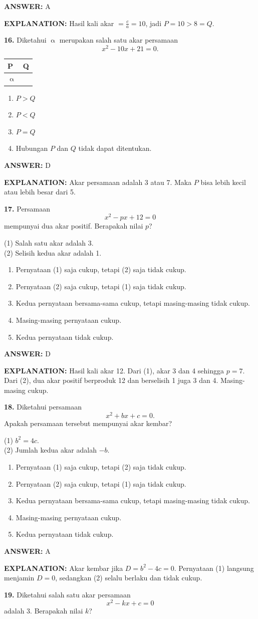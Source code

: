 \documentclass[11pt,a4paper]{article}
\newcommand{\answer}[1]{\par\medskip\textbf{\color{jawab}ANSWER:} #1\par}
\newcommand{\explanation}[1]{\textbf{\color{jelas}EXPLANATION:} #1\par\medskip}
\newcommand{\question}[1]{\Needspace{7\baselineskip}\par\medskip\textbf{#1}\quad}
\newenvironment{choices}{\begin{enumerate}[label=\Alph*.,leftmargin=1.8em]}{\end{enumerate}}
\begin{document}
\answer{A}\explanation{Hasil kali akar $=\frac ca=10$, jadi $P=10>8=Q$.}
\question{16.} Diketahui $\upalpha$ merupakan salah satu akar persamaan \[x^2-10x+21=0.\]
\begin{center}\begin{tabular}{|>{\centering\arraybackslash}p{}|>{\centering\arraybackslash}p{}|}\hline\textbf{P}&\textbf{Q}\\\hline$\upalpha$&5\\\hline\end{tabular}\end{center}
\begin{choices}\item $P>Q$\item $P<Q$\item $P=Q$\item Hubungan $P$ dan $Q$ tidak dapat ditentukan.\end{choices}
\answer{D}\explanation{Akar persamaan adalah 3 atau 7. Maka $P$ bisa lebih kecil atau lebih besar dari 5.}
\question{17.} Persamaan \[x^2-px+12=0\] mempunyai dua akar positif. Berapakah nilai $p$?

(1) Salah satu akar adalah 3.\\
(2) Selisih kedua akar adalah 1.
\begin{choices}\item Pernyataan (1) saja cukup, tetapi (2) saja tidak cukup.\item Pernyataan (2) saja cukup, tetapi (1) saja tidak cukup.\item Kedua pernyataan bersama-sama cukup, tetapi masing-masing tidak cukup.\item Masing-masing pernyataan cukup.\item Kedua pernyataan tidak cukup.\end{choices}
\answer{D}\explanation{Hasil kali akar 12. Dari (1), akar 3 dan 4 sehingga $p=7$. Dari (2), dua akar positif berproduk 12 dan berselisih 1 juga 3 dan 4. Masing-masing cukup.}
\question{18.} Diketahui persamaan \[x^2+bx+c=0.\] Apakah persamaan tersebut mempunyai akar kembar?

(1) $b^2=4c$.\\
(2) Jumlah kedua akar adalah $-b$.
\begin{choices}\item Pernyataan (1) saja cukup, tetapi (2) saja tidak cukup.\item Pernyataan (2) saja cukup, tetapi (1) saja tidak cukup.\item Kedua pernyataan bersama-sama cukup, tetapi masing-masing tidak cukup.\item Masing-masing pernyataan cukup.\item Kedua pernyataan tidak cukup.\end{choices}
\answer{A}\explanation{Akar kembar jika $D=b^2-4c=0$. Pernyataan (1) langsung menjamin $D=0$, sedangkan (2) selalu berlaku dan tidak cukup.}
\question{19.} Diketahui salah satu akar persamaan \[x^2-kx+c=0\] adalah 3. Berapakah nilai $k$?
\end{document}
